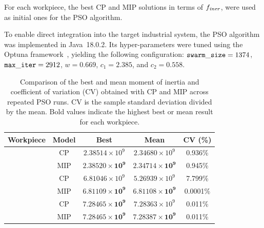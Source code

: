 For each workpiece, the best CP and MIP solutions in terms of $f_\mathit{iner}$, were used as initial ones for the PSO algorithm. 

To enable direct integration into the target industrial system, the PSO algorithm was implemented in Java~18.0.2. Its hyper-parameters were tuned using the Optuna framework~\cite{akiba2019optuna}, yielding the following configuration: $\mathtt{swarm\_size} = 1374$, $\mathtt{max\_iter} = 2912$, $w = 0.669$, $c_1 = 2.385$, and $c_2 = 0.558$.


\begin{table}[!t]
	\centering
	\footnotesize
	\renewcommand{\arraystretch}{1.3}
	\setlength{\tabcolsep}{5pt}
	
	\caption{Comparison of the best and mean moment of inertia and coefficient of variation (CV) obtained with CP and MIP across repeated PSO runs. CV is the sample standard deviation divided by the mean. Bold values indicate the highest best or mean result for each workpiece.}
	
	\label{tab:pso_cp_mip_comparison}
	
	\begin{tabular}{l c c c c}
		
		\hline
		
		Workpiece & Model & Best & Mean & CV (\%) \\
		
		\hline
		
		 & CP & $2.38514\times 10^{9}$ & $2.34680\times 10^{9}$ & 0.936\% \\
		& MIP & $\mathbf{2.38520\times 10^{9}}$ & $\mathbf{2.34714\times 10^{9}}$ & 0.945\% \\
		
		\hline
		
		 & CP & $6.81046\times 10^{9}$ & $5.26939\times 10^{9}$ & 7.799\% \\
		& MIP & $\mathbf{6.81109\times 10^{9}}$ & $\mathbf{6.81108\times 10^{9}}$ & 0.0001\% \\
		
		\hline
		
		 & CP & $\mathbf{7.28465\times 10^{9}}$ & $7.28363\times 10^{9}$ & 0.011\% \\
		& MIP & $\mathbf{7.28465\times 10^{9}}$ & $\mathbf{7.28387\times 10^{9}}$ & 0.011\% \\
		

\end{tabular}
\end{table}

